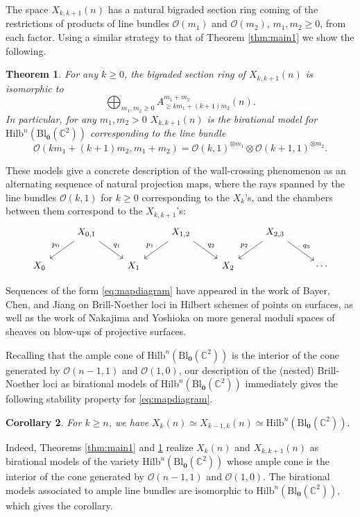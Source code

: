 \documentclass[12pt]{amsart}
\newcommand{\Hilb}{\mathrm{Hilb}}
\newcommand{\C}{\mathbb{C}}
\newcommand{\CO}{\mathcal{O}}
\newcommand{\Bl}{\mathrm{Bl}}
\numberwithin{equation}{section}
\newtheorem{theorem}{Theorem}[section]
\newtheorem{corollary}[theorem]{Corollary}
\theoremstyle{definition}
\begin{document}
The space $X_{k,k+1}(n)$ has a natural bigraded section ring coming of the restrictions of products of line bundles $\CO(m_1)$ and $\CO(m_2)$, $m_1,m_2\geq 0$, from each factor. Using a similar strategy to that of Theorem \ref{thm:main1} we show the following.

\begin{theorem}\label{thm:main2}
    For any $k\geq 0$, the bigraded section ring of $X_{k,k+1}(n)$ is isomorphic to 
    \[ \bigoplus_{m_1,m_2\geq 0} A^{m_1+m_2}_{\geq km_1+(k+1)m_2}(n). \]
    In particular, for any $m_1,m_2>0$ $X_{k,k+1}(n)$ is the birational model for $\Hilb^n(\Bl_{\mathbf{0}}(\C^2))$ corresponding to the line bundle \[ \CO(km_1+(k+1)m_2,m_1+m_2) = \CO(k,1)^{\otimes m_1}\otimes \CO(k+1,1)^{\otimes m_2}. \]
\end{theorem}

These models give a concrete description of the wall-crossing phenomenon as an alternating sequence of natural projection maps, where the rays spanned by the line bundles $\CO(k,1)$ for $k\geq 0$ corresponding to the $X_k$'s, and the chambers between them correspond to the $X_{k,k+1}$'s:
\begin{equation}\label{eq:mapdiagram}
    \begin{tikzcd}
    &X_{0,1} \arrow[dl,"p_{0}"'] \arrow[dr,"q_1"] && X_{1,2} \arrow[dl,"p_1"'] \arrow[dr,"q_{2}"] && X_{2,3} \arrow[dl,"p_{2}"']\arrow[dr,"q_{3}"] \\
    X_0 &&X_1 && X_{2} && \cdots
\end{tikzcd}
\end{equation} 

Sequences of the form \eqref{eq:mapdiagram} have appeared in the work of Bayer, Chen, and Jiang \cite{Bayer} on Brill-Noether loci in Hilbert schemes of points on surfaces, as well as the work of Nakajima and Yoshioka \cite{NY2} on more general moduli spaces of sheaves on blow-ups of projective surfaces. 

Recalling that the ample cone of $\Hilb^n(\Bl_\mathbf{0}(\C^2))$ is the interior of the cone generated by $\CO(n-1,1)$ and $\CO(1,0)$, our description of the (nested) Brill-Noether loci as birational models of $\Hilb^n(\Bl_{\mathbf{0}}(\C^2))$ immediately gives the following stability property for \eqref{eq:mapdiagram}.

\begin{corollary}\label{cor:X_k and blowup}
    For $k\geq n$, we have $X_k(n)\simeq X_{k-1,k}(n)\simeq \Hilb^n(\Bl_{\mathbf{0}}(\C^2)).$
\end{corollary}
Indeed, Theorems \ref{thm:main1} and \ref{thm:main2} realize $X_k(n)$ and $X_{k,k+1}(n)$ as birational models of the variety $\Hilb^n(\Bl_{\mathbf{0}}(\C^2))$ whose ample cone is the interior of the cone generated by $\CO(n-1,1)$ and $\CO(1,0)$. The birational models associated to ample line bundles are isomorphic to $\Hilb^n(\Bl_{\mathbf{0}}(\C^2))$, which gives the corollary.
\end{document}
